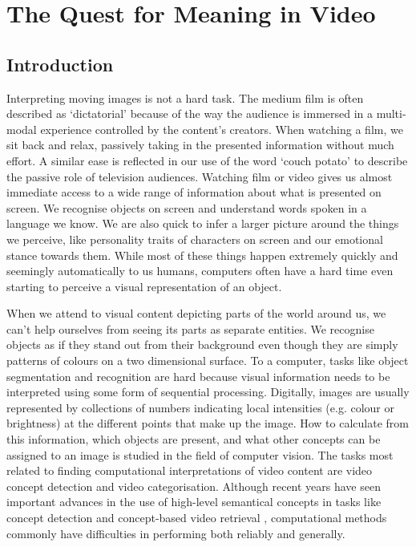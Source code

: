 \chapter{The Quest for Meaning in Video}
\label{ch:meaning_in_video}

\section{Introduction} %
\label{sec:introduction}

Interpreting moving images is not a hard task. The medium film is often described as `dictatorial' because of the way the audience is immersed in a multi-modal experience controlled by the content's creators. When watching a film, we sit back and relax, passively taking in the presented information without much effort. A similar ease is reflected in our use of the word `couch potato' to describe the passive role of television audiences. Watching film or video gives us almost immediate access to a wide range of information about what is presented on screen. We recognise objects on screen and understand words spoken in a language we know. We are also quick to infer a larger picture around the things we perceive, like personality traits of characters on screen and our emotional stance towards them. While most of these things happen extremely quickly and seemingly automatically to us humans, computers often have a hard time even starting to perceive a visual representation of an object.

When we attend to visual content depicting parts of the world around us, we can't help ourselves from seeing its parts as separate entities. We recognise objects as if they stand out from their background even though they are simply patterns of colours on a two dimensional surface. To a computer, tasks like object segmentation and recognition are hard because visual information needs to be interpreted using some form of sequential processing. Digitally, images are usually represented by collections of numbers indicating local intensities (e.g. colour or brightness) at the different points that make up the image. How to calculate from this information, which objects are present, and what other concepts can be assigned to an image is studied in the field of computer vision. The tasks most related to finding computational interpretations of video content are video concept detection and video categorisation. Although recent years have seen important advances in the use of high-level semantical concepts in tasks like concept detection and concept-based video retrieval \cite{Snoek:2009dq, Snoek:jf, Worring:2007vm, Chang:2008wh}, computational methods commonly have difficulties in performing both reliably and generally\cite{Urban:2006up, Snoek:2009dq}.

